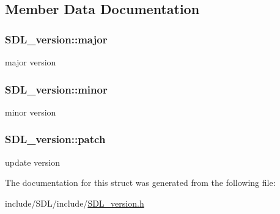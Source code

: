 \subsection{Member Data Documentation}
\hypertarget{struct_s_d_l__version_ad7d7674532073eed237b90f546c97cd0}{
\subsubsection[{major}]{ S\-D\-L\-\_\-version\-::major}}\label{struct_s_d_l__version_ad7d7674532073eed237b90f546c97cd0}
major version \hypertarget{struct_s_d_l__version_a6c35c7bf80245028d5970e6a504ecf57}{
\subsubsection[{minor}]{ S\-D\-L\-\_\-version\-::minor}}\label{struct_s_d_l__version_a6c35c7bf80245028d5970e6a504ecf57}
minor version \hypertarget{struct_s_d_l__version_aa6dacff18edee8cd037c773b843be0f1}{
\subsubsection[{patch}]{ S\-D\-L\-\_\-version\-::patch}}\label{struct_s_d_l__version_aa6dacff18edee8cd037c773b843be0f1}
update version 

The documentation for this struct was generated from the following file\-:\begin{DoxyCompactItemize}
\item 
include/\-S\-D\-L/include/\hyperlink{_s_d_l__version_8h}{S\-D\-L\-\_\-version.\-h}\end{DoxyCompactItemize}
